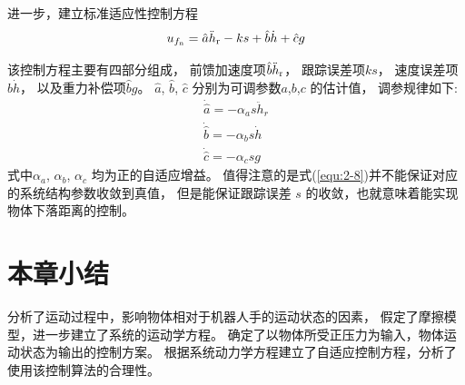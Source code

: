 \begin{note}
\end{note}


进一步，建立标准适应性控制方程 \cite{ref10}
\begin{equation}
  {u_{{f_{\rm n}}}} = \hat a{\ddot h_{\rm r}} - ks + \hat b\dot h + \hat cg
  \label{equ:2-7}
\end{equation}

\begin{note}
\end{note}

该控制方程主要有四部分组成，
前馈加速度项$\hat b{\ddot h_{\rm r}}$， 跟踪误差项$ks$，
速度误差项$\hat b\dot h$， 以及重力补偿项$\hat bg$。
$\hat a$, $\hat b$, $\hat c$ 分别为可调参数$a$,$b$,$c$ 的估计值， 调参规律如下:
\begin{equation}
  \label{equ:2-8}
  \begin{array}{l}
    \dot{\hat a} = - {\alpha _a}s{{\ddot h}_r}\\
    \dot{\hat b} = - {\alpha _b}s\dot h\\
    \dot{\hat c} = - {\alpha _c}sg
  \end{array}
\end{equation}
式中${\alpha _a}$, ${\alpha _b}$, ${\alpha _c}$ 均为正的自适应增益。
值得注意的是式(\ref{equ:2-8})并不能保证对应的系统结构参数收敛到真值，
但是能保证跟踪误差 $s$ 的收敛，也就意味着能实现物体下落距离的控制。


\section{本章小结}
分析了运动过程中，影响物体相对于机器人手的运动状态的因素，
假定了摩擦模型，进一步建立了系统的运动学方程。
确定了以物体所受正压力为输入，物体运动状态为输出的控制方案。
根据系统动力学方程建立了自适应控制方程，分析了使用该控制算法的合理性。

